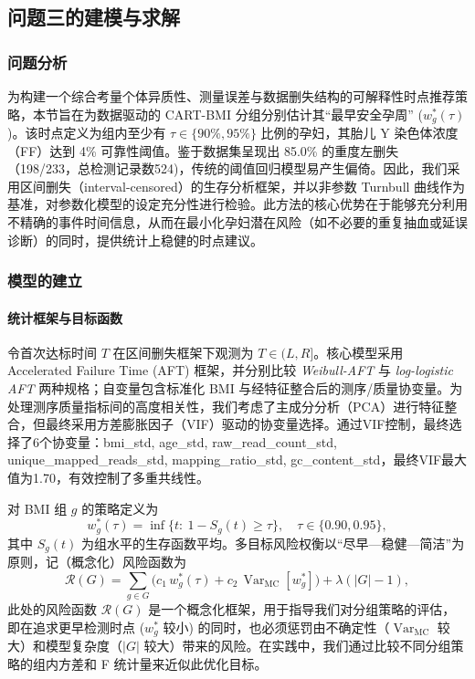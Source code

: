 \documentclass[withoutpreface]{cumcmthesis}
\begin{document}
\subsection{问题三的建模与求解}
\subsubsection{问题分析}
为构建一个综合考量个体异质性、测量误差与数据删失结构的可解释性时点推荐策略，本节旨在为数据驱动的 CART-BMI 分组分别估计其``最早安全孕周'' ($w^{*}_g(\tau)$)。该时点定义为组内至少有 $\tau \in \{90\%, 95\%\}$ 比例的孕妇，其胎儿 Y 染色体浓度（FF）达到 4\% 可靠性阈值。鉴于数据集呈现出 85.0\% 的重度左删失（198/233，总检测记录数524)，传统的阈值回归模型易产生偏倚。因此，我们采用区间删失（interval-censored）的生存分析框架，并以非参数 Turnbull 曲线作为基准，对参数化模型的设定充分性进行检验。此方法的核心优势在于能够充分利用不精确的事件时间信息，从而在最小化孕妇潜在风险（如不必要的重复抽血或延误诊断）的同时，提供统计上稳健的时点建议。

\subsubsection{模型的建立}
\paragraph{统计框架与目标函数} 令首次达标时间 $T$ 在区间删失框架下观测为 $T\in(L,R]$。核心模型采用 Accelerated Failure Time (AFT) 框架，并分别比较 \emph{Weibull-AFT} 与 \emph{log-logistic AFT} 两种规格；自变量包含标准化 BMI 与经特征整合后的测序/质量协变量。为处理测序质量指标间的高度相关性，我们考虑了主成分分析（PCA）进行特征整合，但最终采用方差膨胀因子（VIF）驱动的协变量选择。通过VIF控制，最终选择了6个协变量：bmi\_std, age\_std, raw\_read\_count\_std, unique\_mapped\_reads\_std, mapping\_ratio\_std, gc\_content\_std，最终VIF最大值为1.70，有效控制了多重共线性。

对 BMI 组 $g$ 的策略定义为
\[
w^{*}_g(\tau)=\inf\{t:\ 1-S_g(t)\ge \tau\},\quad \tau\in\{0.90,0.95\},
\]
其中 $S_g(t)$ 为组水平的生存函数平均。多目标风险权衡以“尽早—稳健—简洁”为原则，记（概念化）风险函数为
\[
\mathcal R(G)=\sum_{g\in G}\Big(c_1\,w^{*}_g(\tau)+c_2\,\operatorname{Var}_\text{MC}[w^{*}_g]\Big)+\lambda(|G|-1),
\]
此处的风险函数 $\mathcal R(G)$ 是一个概念化框架，用于指导我们对分组策略的评估，即在追求更早检测时点 ($w^{*}_g$ 较小) 的同时，也必须惩罚由不确定性（$\operatorname{Var}_\text{MC}$ 较大）和模型复杂度（$|G|$ 较大）带来的风险。在实践中，我们通过比较不同分组策略的组内方差和 F 统计量来近似此优化目标。
\end{document}
